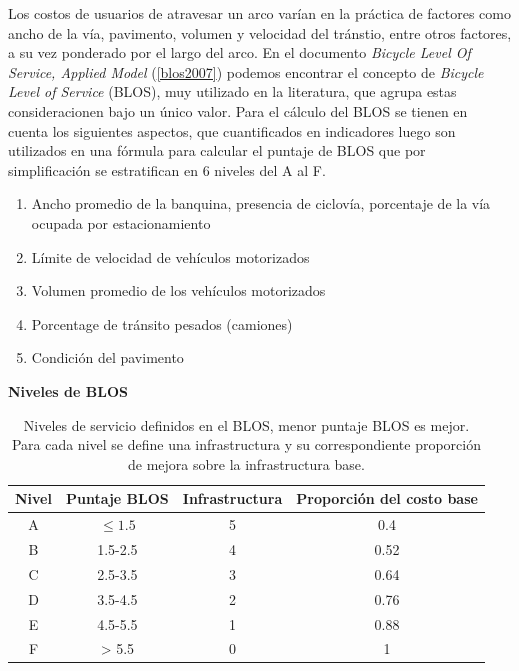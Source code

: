 \documentclass{article}
\begin{document}
  Los costos de usuarios de atravesar un arco varían en la práctica de factores como ancho de la vía, pavimento, volumen y velocidad del tránstio, entre otros factores, a su vez ponderado por el largo del arco. En el documento {\it Bicycle Level Of Service, Applied Model} (\ref{blos2007}) podemos encontrar el concepto de {\it Bicycle Level of Service} (BLOS), muy utilizado en la literatura, que agrupa estas consideracionen bajo un único valor. Para el cálculo del BLOS se tienen en cuenta los siguientes aspectos, que cuantificados en indicadores luego son utilizados en una fórmula para calcular el puntaje de BLOS que por simplificación se estratifican en 6 niveles del A al F.

  \begin{enumerate}
    \item{Ancho promedio de la banquina, presencia de ciclovía, porcentaje de la vía ocupada por estacionamiento}
    \item{Límite de velocidad de vehículos motorizados}
    \item{Volumen promedio de los vehículos motorizados}
    \item{Porcentage de tránsito pesados (camiones)}
    \item{Condición del pavimento}
  \end{enumerate}

  \begin{table}[h!]
    \centering
    \caption*{{\bf Niveles de BLOS}}
    \begin{tabular}{cccc}
      \toprule
        Nivel & Puntaje BLOS & Infrastructura & Proporción del costo base \\
      \midrule
        A     & $\leq 1.5$   & 5              & 0.4   \\
        B     & 1.5-2.5      & 4              & 0.52  \\
        C     & 2.5-3.5      & 3              & 0.64  \\
        D     & 3.5-4.5      & 2              & 0.76  \\
        E     & 4.5-5.5      & 1              & 0.88  \\
        F     & > 5.5        & 0              & 1     \\
      \bottomrule
    \end{tabular}
    \caption{Niveles de servicio definidos en el BLOS, menor puntaje BLOS es mejor. Para cada nivel se define una infrastructura y su correspondiente proporción de mejora sobre la infrastructura base.}\label{table:blosscores}
  \end{table}
\end{document}
